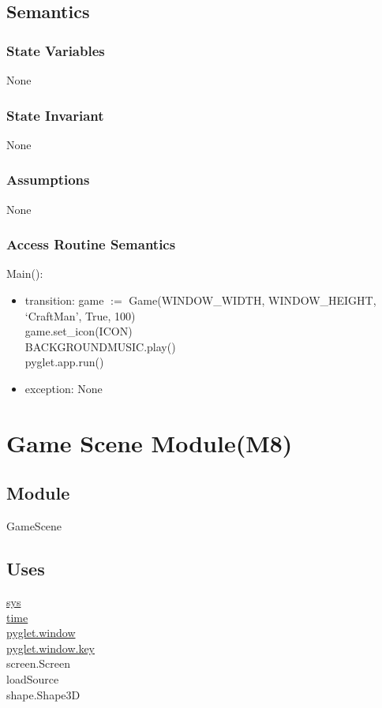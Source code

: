 \documentclass{article}
\begin{document}
\subsection {Semantics}

\subsubsection {State Variables}
None

\subsubsection {State Invariant}
None

\subsubsection {Assumptions}
None

\subsubsection {Access Routine Semantics}
\noindent Main():
\begin{itemize}
\item transition: game $:=$ Game(WINDOW\_WIDTH, WINDOW\_HEIGHT, `CraftMan', True, 100)\\
    game.set\_icon(ICON)\\
    BACKGROUNDMUSIC.play()\\
    pyglet.app.run()
\item exception: None
\end{itemize}\vspace{6mm}

\newpage


\section {Game Scene Module(M8)}

\subsection{Module}
GameScene

\subsection {Uses}
\href{https://docs.python.org/3/library/sys.html}{sys}\\
\href{https://docs.python.org/3/library/time.html}{time}\\
\href{https://pyglet.readthedocs.io/en/latest/modules/window.html}{pyglet.window}\\
\href{https://pyglet.readthedocs.io/en/latest/modules/window_key.html}{pyglet.window.key}\\
screen.Screen\\
loadSource\\
shape.Shape3D
\end{document}
